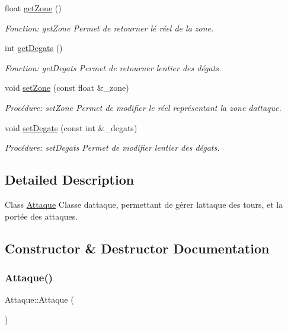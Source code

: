 \begin{DoxyCompactItemize}
float \hyperlink{classAttaque_a84b1813598ac33dfcb76652d7ad4ebd4}{get\+Zone} ()
\begin{DoxyCompactList}\small\item\em Fonction\+: get\+Zone Permet de retourner lé réel de la zone. \end{DoxyCompactList}\item 
int \hyperlink{classAttaque_a56856e2880988e4cf9b051d32ca427a3}{get\+Degats} ()
\begin{DoxyCompactList}\small\item\em Fonction\+: get\+Degats Permet de retourner l\textquotesingle{}entier des dégats. \end{DoxyCompactList}\item 
void \hyperlink{classAttaque_ae6dc5afd850f4518e937b8a2c08ac764}{set\+Zone} (const float \&\+\_\+zone)
\begin{DoxyCompactList}\small\item\em Procédure\+: set\+Zone Permet de modifier le réel représentant la zone d\textquotesingle{}attaque. \end{DoxyCompactList}\item 
void \hyperlink{classAttaque_ad1af4e5ae848c40c7879fa4f9a56c674}{set\+Degats} (const int \&\+\_\+degats)
\begin{DoxyCompactList}\small\item\em Procédure\+: set\+Degats Permet de modifier l\textquotesingle{}entier des dégats. \end{DoxyCompactList}\end{DoxyCompactItemize}


\subsection{Detailed Description}
Class \hyperlink{classAttaque}{Attaque} Classe d\textquotesingle{}attaque, permettant de gérer l\textquotesingle{}attaque des tours, et la portée des attaques. 

\subsection{Constructor \& Destructor Documentation}
\mbox{\label{classAttaque_a1683db1342d1d26f9fc2162ef1975b23}} 
\subsubsection{\texorpdfstring{Attaque()}{Attaque()}\hspace{0.1cm}{\footnotesize\ttfamily [1/3]}}
{\footnotesize\ttfamily Attaque\+::\+Attaque (\begin{DoxyParamCaption}{ }\end{DoxyParamCaption})}



